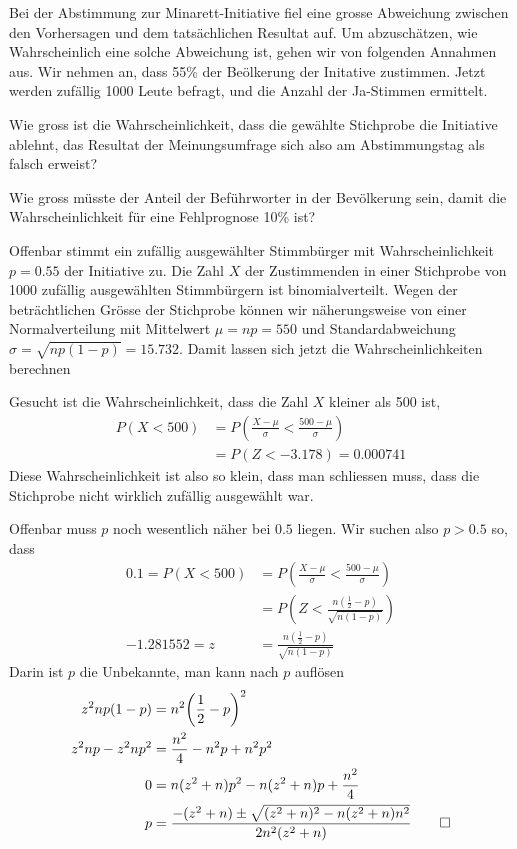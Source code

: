 Bei der Abstimmung zur Minarett-Initiative fiel eine grosse Abweichung zwischen
den Vorhersagen und dem tatsächlichen Resultat auf. Um abzuschätzen,
wie Wahrscheinlich eine solche Abweichung ist, gehen wir von folgenden
Annahmen aus. Wir nehmen an, dass 55\% der Beölkerung der Initative
zustimmen. Jetzt werden zufällig 1000 Leute befragt, und die Anzahl der
Ja-Stimmen ermittelt.
\begin{teilaufgaben}
\item
Wie gross ist die Wahrscheinlichkeit, dass die
gewählte Stichprobe die Initiative ablehnt, das Resultat der
Meinungsumfrage sich also am Abstimmungstag als falsch erweist?
\item Wie gross müsste der Anteil der Beführworter in der Bevölkerung
sein, damit die Wahrscheinlichkeit für eine Fehlprognose 10\% ist?
\end{teilaufgaben}

\begin{loesung}
Offenbar stimmt ein zufällig ausgewählter Stimmbürger mit
Wahrscheinlichkeit $p=0.55$ der Initiative zu. Die Zahl $X$ der Zustimmenden
in einer Stichprobe von 1000 zufällig ausgewählten Stimmbürgern ist
binomialverteilt. Wegen der beträchtlichen Grösse der Stichprobe können
wir näherungsweise von einer Normalverteilung mit Mittelwert $\mu=np=550$ und
Standardabweichung $\sigma=\sqrt{np(1-p)}
=15.732
$.
Damit lassen sich jetzt die Wahrscheinlichkeiten berechnen
\begin{teilaufgaben}
\item
Gesucht ist die Wahrscheinlichkeit, dass die Zahl $X$ kleiner als 500 ist,
\begin{align*}
P(X < 500)&=P\left(\frac{X-\mu}{\sigma}<\frac{500-\mu}{\sigma}\right)\\
        &=P(Z<
-3.178
)=0.000741
\end{align*}
Diese Wahrscheinlichkeit ist also so klein, dass man schliessen muss,
dass die Stichprobe nicht wirklich zufällig ausgewählt war.
\item
Offenbar muss $p$ noch wesentlich näher bei $0.5$ liegen.  Wir suchen also
$p>0.5$ so, dass
\begin{align*}
0.1=P(X<500)&=P\left(\frac{X-\mu}{\sigma}<\frac{500-\mu}{\sigma}\right)\\
&=P\left(Z<\frac{n(\frac12-p)}{\sqrt{n(1-p)}}\right)\\
-1.281552=
z&=\frac{n(\frac12-p)}{\sqrt{n(1-p)}}
\end{align*}
Darin ist $p$ die Unbekannte, man kann nach $p$ auflösen
\begin{align*}
z^2np(1-p)&=n^2\biggl(\frac12-p\biggr)^2\\
z^2np-z^2np^2
&=\frac{n^2}4-n^2p+n^2p^2
\\
0&=n(z^2+n)p^2
-n(z^2+n)p
+\frac{n^2}4
\\
p&=\frac{-(z^2+n)\pm\sqrt{(z^2+n)^2-n(z^2+n)n^2}}{2n^2(z^2+n)}
\qedhere
\end{align*}
\end{teilaufgaben}
\end{loesung}

